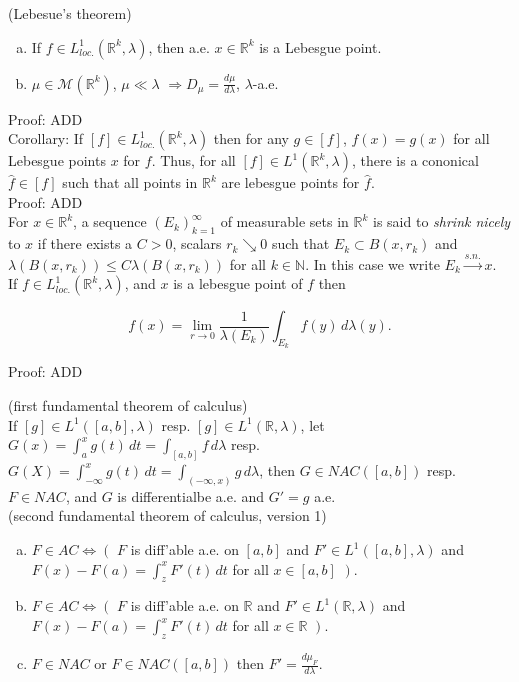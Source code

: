 \documentclass[12pt]{article}
\newcommand{\rimply}[0] { \Rightarrow }
\newcommand{\lrimply}[0] { \Leftrightarrow }
\newcommand{\rarw}[0] { \rightarrow }
\newcommand{\nats}[0] { \mathbb{N}}
\newcommand{\reals}[0] { \mathbb{R}}
\newcommand{\M}[0] { \mathcal{M} }
\begin{document}
(Lebesue's theorem)
\begin{enumerate}[a)]
\item
If $f \in L^1_{loc.}(\reals^k, \lambda)$, then a.e. $x \in \reals^k$ is a Lebesgue point.
\item 
$\mu \in \M(\reals^k)$, $\mu \ll \lambda$ $\rimply D_\mu = \frac{d\mu}{d\lambda}$, $\lambda$-a.e.
\end{enumerate}


\noindent
Proof: ADD \\

Corollary:
If $[f] \in L^1_{loc.}(\reals^k, \lambda)$ then for any $g \in [f]$, $f(x) = g(x)$ for all Lebesgue points $x$ for $f$. Thus, for all $[f] \in L^1(\reals^k, \lambda)$, there is a cononical $\hat{f} \in [f]$ such that all points in $\reals^k$ are lebesgue points for $\hat{f}$.     \\

\noindent
Proof: ADD \\




For $x \in \reals^k$, a sequence $(E_k)_{k=1}^\infty$ of measurable sets in $\reals^k$ is said to \emph{shrink nicely} to $x$ if there exists a $C>0$, scalars $r_k \searrow 0$ such that $E_k \subset B(x, r_k)$ and $ \lambda(B(x,r_k)) \le C \lambda(B(x, r_k))$ for all $k \in \nats$. In this case we write $E_k \overset{s.n.}{\rarw} x$. \\

If $f \in L^1_{loc.}(\reals^k, \lambda)$, and $x$ is a lebesgue point of $f$ then 

$$
f(x) = \lim_{r \rarw 0} \frac{1}{ \lambda(E_k)} \int_{E_k} f(y) \, d \lambda(y).
$$

\noindent
Proof: ADD \\


\break


(first fundamental theorem of calculus)  \\

\noindent
If $[g] \in L^1([a,b], \lambda )$ resp. $[g] \in L^1(\reals, \lambda)$, let $G(x) = \int_a^x g(t) \, dt = \int_{[a,b]} f \, d\lambda$ resp. $G(X) = \int_{-\infty}^x g(t) \, dt = \int_{(-\infty,x)} g \, d\lambda$, then $G \in NAC([a,b])$ resp. $F \in NAC$, and $G$ is differentialbe a.e. and $G' = g$ a.e. \\

(second fundamental theorem of calculus, version 1)
\begin{enumerate}[a)]
\item
$F \in AC \lrimply \left( \right.$  $F$ is diff'able a.e. on $[a,b]$ and $F' \in L^1([a,b], \lambda)$ and $F(x) - F(a) = \int_z^x F'(t)\, dt$ for all $x \in [a,b]$ $\left. \right)$.
\item
$F \in AC \lrimply \left( \right.$  $F$ is diff'able a.e. on $\reals$ and $F' \in L^1(\reals, \lambda)$ and $F(x) - F(a) = \int_z^x F'(t)\, dt$ for all $x \in \reals$ $\left. \right)$.
\item
$F \in NAC$ or $F \in NAC([a,b])$ then $F' = \frac{d\mu_F}{d\lambda}$.
\end{enumerate}
\end{document}
